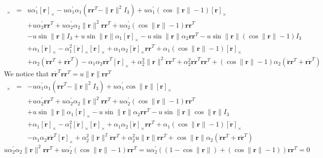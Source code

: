 \documentclass {article}
\newcommand\rot{\mathbf{r}}
\newcommand\rcross{[\rot]_{\times}}
\newcommand\omegacross{[\omega]_{\times}}
\newcommand\rdotcross{\left[\dot{\rot}\right]_{\times}}
\newcommand\normr{\|\rot\|}
\newcommand\alphap{\alpha^{\prime}}
\begin{document}
\begin{eqnarray*}
\omegacross &=&
u \alphap_1 \rcross - u \alphap_1\alpha_1 (\rot\rot^T-\normr^2 I_3) + u \alphap_1 (\cos\normr-1) \rcross\\
&& + u\alphap_2 \rot\rot^T + u\alphap_2\alpha_2\normr^2\rot\rot^T + u\alphap_2 (\cos\normr-1) \rot\rot^T\\
&& -u \sin\normr I_3 + u \sin\normr\alpha_1 \rcross - u \sin\normr\alpha_2 \rot\rot^T - u \sin\normr(\cos\normr-1) I_3\\
&& +\alpha_1 \rdotcross - \alpha_1^2 \rdotcross\rcross + \alpha_1 \alpha_2 \rdotcross\rot\rot^T + \alpha_1(\cos\normr-1)\rdotcross\\
&&+\alpha_2 (\dot{\rot}\rot^T + \rot\dot{\rot}^T) - \alpha_1 \alpha_2 \rot\dot{\rot}^T\rcross +  \alpha_2^2\normr^2\dot{\rot}\rot^T + \alpha_2^2\rot\dot{\rot}^T\rot\rot^T + (\cos\normr-1)\alpha_2 (\dot{\rot}\rot^T + \rot\dot{\rot}^T)
\end{eqnarray*}
We notice that $\rot\dot{\rot}^T\rot\rot^T=u\normr\rot\rot^T$
\begin{eqnarray*}
\omegacross &=&
- u \alphap_1\alpha_1 (\rot\rot^T-\normr^2 I_3) + u \alphap_1 \cos\normr \rcross\\
&& + u\alphap_2 \rot\rot^T + u\alphap_2\alpha_2\normr^2\rot\rot^T + u\alphap_2 (\cos\normr-1) \rot\rot^T\\
&& + u \sin\normr\alpha_1 \rcross - u \sin\normr\alpha_2 \rot\rot^T - u \sin\normr\cos\normr I_3\\
&& +\alpha_1 \rdotcross - \alpha_1^2 \rdotcross\rcross + \alpha_1 \alpha_2 \rdotcross\rot\rot^T + \alpha_1(\cos\normr-1)\rdotcross\\
&&- \alpha_1 \alpha_2 \rot\dot{\rot}^T\rcross +  \alpha_2^2\normr^2\dot{\rot}\rot^T + \alpha_2^2u\normr\rot\rot^T + \cos\normr\alpha_2 (\dot{\rot}\rot^T + \rot\dot{\rot}^T)
\end{eqnarray*}
$$
u\alphap_2\alpha_2\normr^2\rot\rot^T + u\alphap_2 (\cos\normr-1) \rot\rot^T =
u\alphap_2((1-\cos\normr)+(\cos\normr-1)) \rot\rot^T = 0
$$
\end{document}
